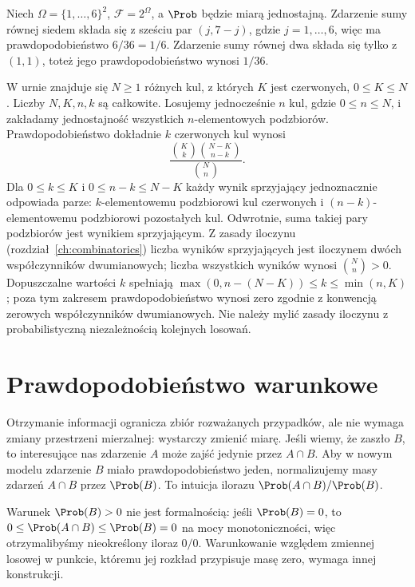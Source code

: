 \begin{przyklad}
Niech $\Omega=\{1,\ldots,6\}^2$, $\mathcal F=2^\Omega$,
a $\Prob$ będzie miarą jednostajną.
Zdarzenie sumy równej siedem składa się z sześciu par
$(j,7-j)$, gdzie $j=1,\ldots,6$, więc ma prawdopodobieństwo $6/36=1/6$. Zdarzenie sumy równej dwa
składa się tylko z $(1,1)$, toteż jego prawdopodobieństwo wynosi $1/36$.
\end{przyklad}

\begin{przyklad}
W urnie znajduje się $N\geq1$ różnych kul, z których $K$
jest czerwonych, $0\leq K\leq N$. Liczby $N,K,n,k$ są całkowite.
Losujemy jednocześnie $n$ kul, gdzie $0\leq n\leq N$, i zakładamy
jednostajność wszystkich $n$-elementowych podzbiorów.
Prawdopodobieństwo dokładnie $k$ czerwonych kul wynosi
\[
\frac{\binom Kk\binom{N-K}{n-k}}{\binom Nn}.
\]
Dla $0\leq k\leq K$ i $0\leq n-k\leq N-K$ każdy wynik
sprzyjający jednoznacznie odpowiada parze:
$k$-elementowemu podzbiorowi kul czerwonych i $(n-k)$-elementowemu
podzbiorowi pozostałych kul. Odwrotnie, suma takiej pary podzbiorów
jest wynikiem sprzyjającym. Z zasady iloczynu (rozdział~\ref{ch:combinatorics})
liczba wyników sprzyjających jest iloczynem dwóch współczynników
dwumianowych; liczba wszystkich wyników wynosi $\binom Nn>0$.
Dopuszczalne wartości $k$ spełniają
$\max(0,n-(N-K))\leq k\leq\min(n,K)$; poza tym zakresem
prawdopodobieństwo wynosi zero zgodnie z konwencją zerowych
współczynników dwumianowych. Nie należy mylić zasady iloczynu
z probabilistyczną niezależnością kolejnych losowań.
\end{przyklad}

\section{Prawdopodobieństwo warunkowe}
Otrzymanie informacji ogranicza zbiór rozważanych przypadków,
ale nie wymaga zmiany przestrzeni mierzalnej: wystarczy zmienić miarę.
Jeśli wiemy, że zaszło $B$, to interesujące nas zdarzenie $A$
może zajść jedynie przez $A\cap B$. Aby w nowym modelu zdarzenie $B$ miało prawdopodobieństwo
jeden, normalizujemy masy zdarzeń $A\cap B$ przez $\Prob(B)$. To intuicja ilorazu
$\Prob(A\cap B)/\Prob(B)$.

Warunek $\Prob(B)>0$ nie jest formalnością: jeśli $\Prob(B)=0$,
to $0\leq\Prob(A\cap B)\leq\Prob(B)=0$ na mocy monotoniczności,
więc otrzymalibyśmy nieokreślony iloraz $0/0$. Warunkowanie względem zmiennej losowej w punkcie, któremu
jej rozkład przypisuje masę zero, wymaga innej konstrukcji.

